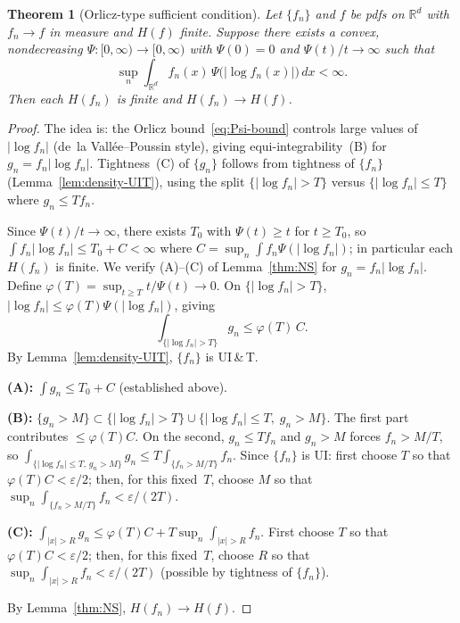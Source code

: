 \documentclass[10pt,a4paper]{amsart}
\newtheorem{theorem}{Theorem}
\newcommand{\Hent}{H}
\newcommand{\Rd}{\mathbb{R}^d}
\newcommand{\abs}[1]{\lvert #1 \rvert}
\newcommand{\dx}{\,dx}
\begin{document}
\begin{theorem}[Orlicz-type sufficient condition]\label{thm:orlicz}
Let $\{f_n\}$ and $f$ be pdfs on $\Rd$ with $f_n \to f$ in measure
and $\Hent(f)$ finite.  Suppose there exists a convex, nondecreasing
$\Psi : [0,\infty) \to [0,\infty)$ with $\Psi(0) = 0$ and
$\Psi(t)/t \to \infty$
such that
\begin{equation}\label{eq:Psi-bound}
  \sup_n \int_{\Rd} f_n(x)\, \Psi\!\bigl(\abs{\log f_n(x)}\bigr) \dx
  < \infty.
\end{equation}
Then each $\Hent(f_n)$ is finite and $\Hent(f_n) \to \Hent(f)$.
\end{theorem}

\begin{proof}
The idea is: the Orlicz bound~\eqref{eq:Psi-bound} controls large
values of $\abs{\log f_n}$ (de~la Vall\'{e}e--Poussin style),
giving equi-integrability~(B) for $g_n = f_n\abs{\log f_n}$.
Tightness~(C) of $\{g_n\}$ follows from tightness of $\{f_n\}$
(Lemma~\ref{lem:density-UIT}), using the split
$\{\abs{\log f_n} > T\}$ versus
$\{\abs{\log f_n} \leq T\}$ where $g_n \leq T f_n$.

Since $\Psi(t)/t \to \infty$, there exists $T_0$ with
$\Psi(t) \geq t$ for $t \geq T_0$, so
$\int f_n \abs{\log f_n} \leq T_0 + C < \infty$ where
$C = \sup_n \int f_n \Psi(\abs{\log f_n})$; in particular each
$\Hent(f_n)$ is finite.
We verify (A)--(C) of Lemma~\ref{thm:NS} for
$g_n = f_n \abs{\log f_n}$.
Define $\varphi(T) = \sup_{t \geq T} t / \Psi(t) \to 0$.  On
$\{\abs{\log f_n} > T\}$,
$\abs{\log f_n} \leq \varphi(T)\Psi(\abs{\log f_n})$, giving
\begin{equation}\label{eq:Psi-tail}
  \int_{\{\abs{\log f_n} > T\}} g_n \leq \varphi(T)\, C.
\end{equation}
By Lemma~\ref{lem:density-UIT}, $\{f_n\}$ is UI\,\&\,T.

\medskip\noindent
\textbf{(A):}\; $\int g_n \leq T_0 + C$ (established above).

\medskip\noindent
\textbf{(B):}\; $\{g_n > M\} \subset
\{\abs{\log f_n} > T\} \cup
\{\abs{\log f_n} \leq T,\; g_n > M\}$.
The first part contributes $\leq \varphi(T) C$.  On the second,
$g_n \leq T f_n$ and $g_n > M$ forces $f_n > M/T$, so
$\int_{\{\abs{\log f_n} \leq T,\, g_n > M\}} g_n
\leq T \int_{\{f_n > M/T\}} f_n$.
Since $\{f_n\}$ is UI: first choose $T$ so that
$\varphi(T) C < \varepsilon/2$; then, for this fixed~$T$,
choose $M$ so that
$\sup_n \int_{\{f_n > M/T\}} f_n < \varepsilon/(2T)$.

\medskip\noindent
\textbf{(C):}\;
$\int_{\abs{x}>R} g_n
\leq \varphi(T) C + T \sup_n \int_{\abs{x}>R} f_n$.
First choose $T$ so that $\varphi(T) C < \varepsilon/2$;
then, for this fixed~$T$, choose $R$ so that
$\sup_n \int_{\abs{x}>R} f_n < \varepsilon/(2T)$
(possible by tightness of $\{f_n\}$).

\medskip
By Lemma~\ref{thm:NS}, $\Hent(f_n) \to \Hent(f)$.
\end{proof}
\end{document}
